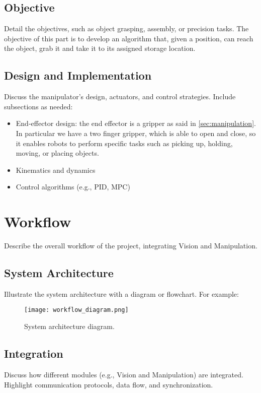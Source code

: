 \documentclass[12pt,a4paper]{article}
\begin{document}
\subsection{Objective}\label{subsec:mobj}
Detail the objectives, such as object grasping, assembly, or precision tasks.
The objective of this part is to develop an algorithm that, given a position, can reach the object, grab it and take it to its assigned storage location.

\subsection{Design and Implementation}\label{susec:design}
Discuss the manipulator's design, actuators, and control strategies. Include subsections as needed:
\begin{itemize}
    \item End-effector design: the end effector is a gripper as said in \ref{sec:manipulation}. In particular we have a two finger gripper, which is able to open and close, so it enables robots to perform specific tasks such as picking up, holding, moving, or placing objects. 
    \item Kinematics and dynamics
    \item Control algorithms (e.g., PID, MPC)
\end{itemize}



\section{Workflow}\label{sec:workflow}
Describe the overall workflow of the project, integrating Vision and Manipulation.


\subsection{System Architecture}\label{subsec:systemarchitecture}
Illustrate the system architecture with a diagram or flowchart. For example:
\begin{figure}[h!]
    \centering
    \texttt{[image: workflow\_diagram.png]} %
    \caption{System architecture diagram.}
    \label{fig:workflow_diagram}
\end{figure}

\subsection{Integration}\label{subsec:integration}
Discuss how different modules (e.g., Vision and Manipulation) are integrated. Highlight communication protocols, data flow, and synchronization.
\end{document}
